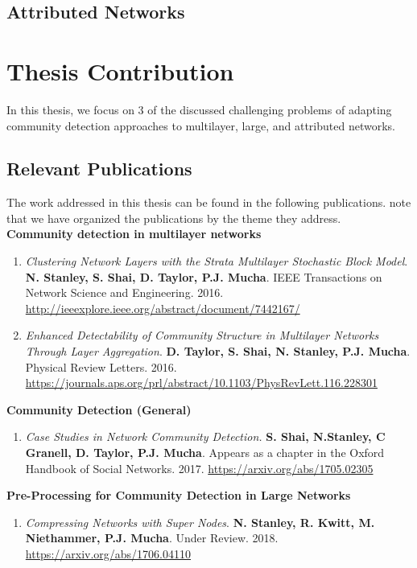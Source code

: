 \subsection{Attributed Networks}

\section{Thesis Contribution}
In this thesis, we focus on 3 of the discussed challenging problems of adapting community detection approaches to multilayer, large, and attributed networks.

\subsection{Relevant Publications}
The work addressed in this thesis can be found in the following publications. note that we have organized the publications by the theme they address. \\

{\bf Community detection in multilayer networks}
\begin{enumerate}
\item \emph{Clustering Network Layers with the Strata Multilayer Stochastic Block Model}. {\bf N. Stanley, S. Shai, D. Taylor, P.J. Mucha}. IEEE Transactions on Network Science and Engineering. 2016. \url{http://ieeexplore.ieee.org/abstract/document/7442167/}
\item \emph{Enhanced Detectability of Community Structure in Multilayer Networks Through Layer Aggregation}. {\bf D. Taylor, S. Shai, N. Stanley, P.J. Mucha}. Physical Review Letters. 2016. \url{https://journals.aps.org/prl/abstract/10.1103/PhysRevLett.116.228301}
\end{enumerate}

{\bf Community Detection (General)}
\begin{enumerate}
\item \emph{Case Studies in Network Community Detection.} {\bf S. Shai, N.Stanley, C Granell, D. Taylor, P.J. Mucha}. Appears as a chapter in the Oxford Handbook of Social Networks. 2017. \url{https://arxiv.org/abs/1705.02305}
\end{enumerate}

{\bf Pre-Processing for Community Detection in Large Networks}
\begin{enumerate}
\item \emph{Compressing Networks with Super Nodes}. {\bf N. Stanley, R. Kwitt, M. Niethammer, P.J. Mucha}. Under Review. 2018. \url{https://arxiv.org/abs/1706.04110}
\end{enumerate}

